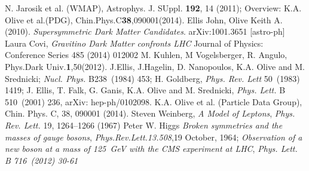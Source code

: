 \begin{thebibliography}{9}
 N. Jarosik et al. (WMAP), Astrophys. J. SUppl. \textbf{192}, 14 (2011); Overview: K.A. Olive et al.(PDG), Chin.Phys.C\textbf{38},090001(2014).
 Ellis John, Olive Keith A. (2010). \textit{Supersymmetric Dark Matter Candidates}. arXiv:1001.3651 [astro-ph]
 Laura Covi, \textit{Gravitino Dark Matter confronts LHC} Journal of Physics: Conference Series 485 (2014) 012002
 M. Kuhlen, M Vogelsberger, R. Angulo, Phys.Dark Univ.\textbf{1},50(2012).
 J.Ellis, J.Hagelin, D. Nanopoulos, K.A. Olive and M. Srednicki; \emph{Nucl. Phys.} B238~(1984) 453; H. Goldberg, \emph{Phys. Rev. Lett} 50~(1983) 1419;
J. Ellis, T. Falk, G. Ganis, K.A. Olive and M. Srednicki, \emph{Phys. Lett.} B 510~(2001) 236, arXiv: hep-ph/0102098.
 K.A. Olive et al. (Particle Data Group), Chin. Phys. C, 38, 090001 (2014).
  Steven Weinberg, \textit{A Model of Leptons}, \emph{Phys. Rev. Lett.} 19, 1264–1266 (1967)
 Peter W. Higgs \textit{Broken symmetries and the masses of gauge bosons}, \emph{Phys.Rev.Lett.13.508},19 October, 1964;
\textit{Observation of a new boson at a mass of 125~GeV with the CMS experiment at LHC}, \emph{Phys. Lett. B 716~(2012) 30-61}





\end{thebibliography}
